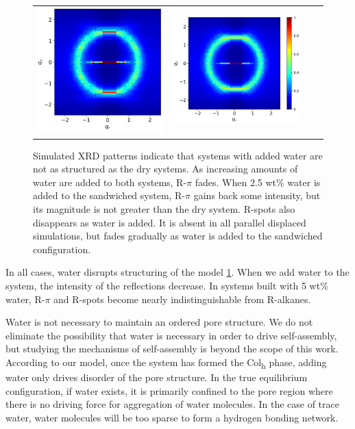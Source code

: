 \documentclass{article}
\begin{document}
\begin{figure}
\begin{tabular}{@{}c@{ }c@{ }c@{ }c@{}}
  	\includegraphics[width=.28\linewidth]{solvated_layered_rzplot_25.png}&
  	\includegraphics[width=.325\linewidth]{solvated_layered_rzplot_5.png}\\[-1ex]
  	\end{tabular}
	\caption{Simulated XRD patterns indicate that systems with added water
		are not as structured as the dry systems. As increasing amounts of water are 
		added to both systems, R-$\pi$ fades. When 2.5 wt\% water is added to the
		sandwiched system, R-$\pi$ gains back some intensity, but its magnitude is not
		greater than the dry system. R-spots also disappears as water is added. It is
		absent in all parallel displaced simulations, but fades gradually as water is
		added to the sandwiched configuration.}%
  \label{fig:solvation}

  \end{figure}
 
  In all cases, water disrupts structuring of the model \ref{fig:solvation}.
  When we add water to the system, the intensity of the reflections decrease. In
  systems built with 5 wt\% water, R-$\pi$ and R-spots become nearly
  indistinguishable from R-alkanes.

  Water is not necessary to maintain an ordered pore structure. We do not
  eliminate the possibility that water is necessary in order to drive
  self-assembly, but studying the mechanisms of self-assembly is beyond the
  scope of this work. According to our model, once the system has formed the
  Col\textsubscript{h} phase, adding water only drives disorder of the pore
  structure. In the true equilibrium configuration, if water exists, it is
  primarily confined to the pore region where there is no driving force for
  aggregation of water molecules. In the case of trace water, water molecules
  will be too sparse to form a hydrogen bonding network.
\end{document}
